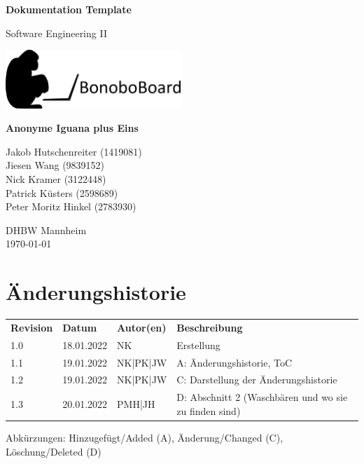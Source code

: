 \documentclass[a4paper,11pt]{scrartcl}
\begin{document}
\renewcommand*{\arraystretch}{1.2}
\begin{titlepage}
    \begin{center}
        \vspace*{1cm}\Huge
        \textbf{Dokumentation Template}\par                
        \vspace{0.5cm}\LARGE        
        Software Engineering II\par           
        \vspace{2cm}
        \includegraphics[width=0.5\textwidth]{Bonobo_Logo}\par   
        \vspace{1cm}
        \textbf{Anonyme Iguana plus Eins}\par        
        \vfill\Large   
        Jakob Hutschenreiter (1419081)\\Jiesen Wang (9839152)\\Nick Kramer (3122448)\\Patrick Küsters (2598689)\\Peter Moritz Hinkel (2783930)\par
        \vspace{2cm}
        DHBW Mannheim\\
        \today     
    \end{center}
\end{titlepage}

\section*{Änderungshistorie}
\begin{table}[h]
	\begin{tabular}{@{} p{20mm} p{25mm} p{25mm} p{75mm}}
		\textbf{Revision} & \textbf{Datum} & \textbf{Autor(en)} & \textbf{Beschreibung}\\
		1.0 & 18.01.2022 & NK & Erstellung\\
		1.1 & 19.01.2022 & NK|PK|JW & A: Änderungshistorie, ToC\\
		1.2 & 19.01.2022 & NK|PK|JW & C: Darstellung der Änderungshistorie\\
		1.3 & 20.01.2022 & PMH|JH & D: Abschnitt 2 (Waschbären und wo sie zu finden sind)
	\end{tabular}
\end{table}
\noindent
Abkürzungen: Hinzugefügt/Added (A), Änderung/Changed (C), Löschung/Deleted (D)
\vspace{2cm}
\tableofcontents
\newpage
{}
\end{document}
